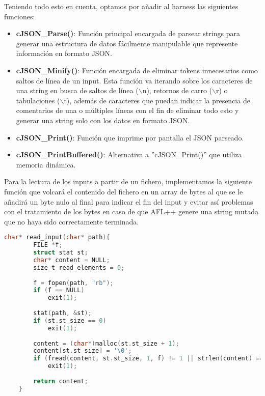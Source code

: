 Teniendo todo esto en cuenta, optamos por añadir al harness las siguientes funciones:
\begin{itemize}
    \item \textbf{cJSON\_Parse()}: Función principal encargada de parsear strings para generar una estructura de datos fácilmente manipulable que represente
    información en formato JSON. 
    \item \textbf{cJSON\_Minify()}: Función encargada de eliminar tokens innecesarios como saltos de línea de un input. Esta función va iterando sobre los
    caracteres de una string en busca de saltos de línea ($\backslash$n), retornos de carro ($\backslash$r) o tabulaciones ($\backslash$t), además de caracteres que 
    puedan indicar la presencia de comentarios de una o múltiples líneas con el fin de eliminar todo esto y generar una string solo con los datos en formato JSON.
    \item \textbf{cJSON\_Print()}: Función que imprime por pantalla el JSON parseado.
    \item \textbf{cJSON\_PrintBuffered()}: Alternativa a ''cJSON\_Print()'' que utiliza memoria dinámica.
\end{itemize}

Para la lectura de los inputs a partir de un fichero, implementamos la siguiente función que volcará el contenido del fichero en un array de bytes al que se le 
añadirá un byte nulo al final para indicar el fin del input y evitar así problemas con el tratamiento de los bytes en caso de que AFL++ genere una string mutada 
que no haya sido correctamente terminada.

\begin{lstlisting}[language=C, caption=Lectura de inputs desde fichero en el harness., captionpos=b,
    frame=single, breaklines, showstringspaces=false]
    char* read_input(char* path){
        FILE *f;
        struct stat st;
        char* content = NULL;
        size_t read_elements = 0;
    
        f = fopen(path, "rb");
        if (f == NULL)
            exit(1);
    
        stat(path, &st);
        if (st.st_size == 0)
            exit(1);
    
        content = (char*)malloc(st.st_size + 1);
        content[st.st_size] = '\0';                                                 // Avoid heap-buffer-overflow in strlen with non null terminated strings
        if (fread(content, st.st_size, 1, f) != 1 || strlen(content) == 0)
            exit(1);
        
        return content;
    }
\end{lstlisting}

